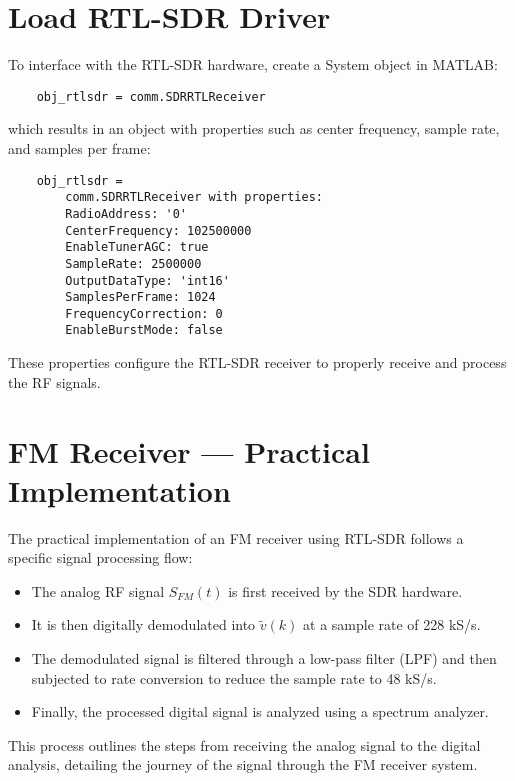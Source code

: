 \section*{Load RTL-SDR Driver}

To interface with the RTL-SDR hardware, create a System object in MATLAB:
\begin{verbatim}
    obj_rtlsdr = comm.SDRRTLReceiver
\end{verbatim}
which results in an object with properties such as center frequency, sample rate, and samples per frame:
\begin{verbatim}
    obj_rtlsdr = 
        comm.SDRRTLReceiver with properties:
        RadioAddress: '0'
        CenterFrequency: 102500000
        EnableTunerAGC: true
        SampleRate: 2500000
        OutputDataType: 'int16'
        SamplesPerFrame: 1024
        FrequencyCorrection: 0
        EnableBurstMode: false
\end{verbatim}
These properties configure the RTL-SDR receiver to properly receive and process the RF signals.

\section*{FM Receiver — Practical Implementation}

The practical implementation of an FM receiver using RTL-SDR follows a specific signal processing flow:
\begin{itemize}
    \item The analog RF signal \( S_{FM}(t) \) is first received by the SDR hardware.
    \item It is then digitally demodulated into \( \tilde{v}(k) \) at a sample rate of 228 kS/s.
    \item The demodulated signal is filtered through a low-pass filter (LPF) and then subjected to rate conversion to reduce the sample rate to 48 kS/s.
    \item Finally, the processed digital signal is analyzed using a spectrum analyzer.
\end{itemize}
This process outlines the steps from receiving the analog signal to the digital analysis, detailing the journey of the signal through the FM receiver system.

